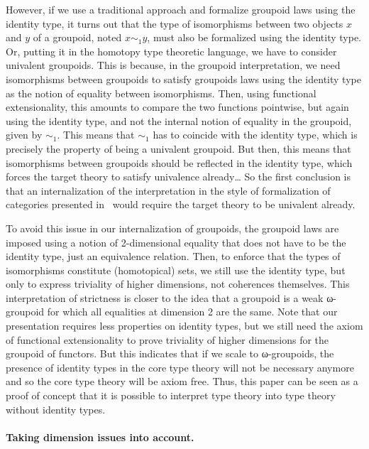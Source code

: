 However, if we use a traditional approach and formalize groupoid laws
using the identity type, it turns out that the type of isomorphisms
between two objects $x$ and $y$ of a groupoid, noted $x \sim_1 y$, must
also be formalized using the identity type. Or, putting it in the
homotopy type theoretic language, we have to consider univalent
groupoids.
%
This is because, in the groupoid interpretation, we need isomorphisms
between groupoids to satisfy groupoids laws using the identity
type as the notion of equality between isomorphisms. Then, using
functional extensionality, this amounts to compare the two functions
pointwise, but again using the identity type, and not the internal
notion of equality in the groupoid, given by $\sim_1$.
%
This means that $\sim_1$ has to coincide with the identity type, which
is precisely the property of being a univalent groupoid.
%
But then, this means that isomorphisms between groupoids should be
reflected in the identity type, which forces the target theory to
satisfy univalence already\ldots
%
So the first conclusion is that an internalization of the interpretation
in the style of formalization of categories presented in~\cite{hottbook}
would require the target theory to be univalent already.
 
To avoid this issue in our internalization of groupoids, the groupoid
laws are imposed using a notion of 2-dimensional equality that does
not have to be the identity type, just an equivalence relation.
%
Then, to enforce that the types of isomorphisms constitute
(homotopical) sets, we still use the identity type, but only to
express triviality of higher dimensions, not coherences themselves.
%
This interpretation of strictness is closer to the idea that a
groupoid is a weak ω-groupoid for which all equalities at dimension 2
are the same.
%
%
Note that our presentation requires less properties on identity types,
but we still need the axiom of functional extensionality to prove
triviality of higher dimensions for the groupoid of functors.
%
But this indicates that if we scale to ω-groupoids, the presence of
identity types in the core type theory will not be necessary anymore
and so the core type theory will be axiom free.
%
Thus, this paper can be seen as a proof of concept that it is possible
to interpret type theory into type theory without identity types.


\paragraph{\bf Taking dimension issues into account.}
%

